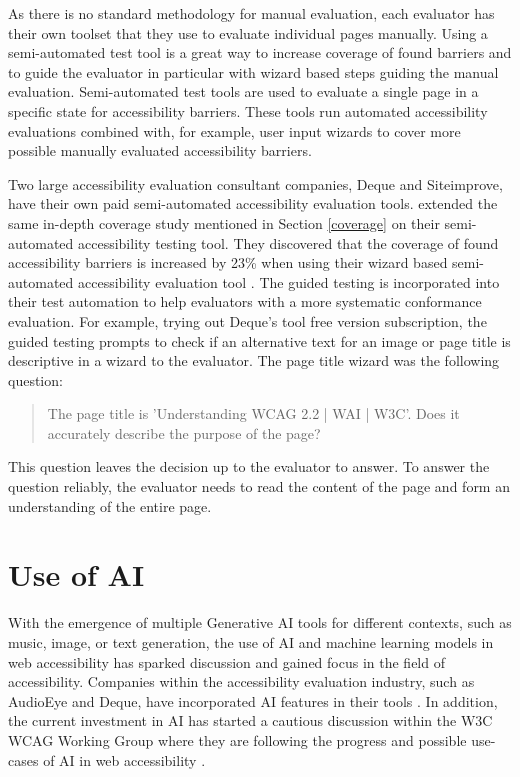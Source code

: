 As there is no standard methodology for manual evaluation, each evaluator has their own toolset that they use to evaluate individual pages manually. Using a semi-automated test tool is a great way to increase coverage of found barriers and to guide the evaluator in particular with wizard based steps guiding the manual evaluation. Semi-automated test tools are used to evaluate a single page in a specific state for accessibility barriers. These tools run automated accessibility evaluations combined with, for example, user input wizards to cover more possible manually evaluated accessibility barriers. 

Two large accessibility evaluation consultant companies, Deque and Siteimprove, have their own paid semi-automated accessibility evaluation tools. \textcite{dequecoverage_semi} extended the same in-depth coverage study mentioned in Section \ref{coverage} on their semi-automated accessibility testing tool. They discovered that the coverage of found accessibility barriers is increased by 23\% when using their wizard based semi-automated accessibility evaluation tool \citep{dequecoverage_semi}. The guided testing is incorporated into their test automation to help evaluators with a more systematic conformance evaluation. For example, trying out Deque's tool free version subscription, the guided testing prompts to check if an alternative text for an image or page title is descriptive in a wizard to the evaluator. The page title wizard was the following question: \blockquote{The page title is 'Understanding WCAG 2.2 | WAI | W3C'. Does it accurately describe the purpose of the page?}. This question leaves the decision up to the evaluator to answer. To answer the question reliably, the evaluator needs to read the content of the page and form an understanding of the entire page.

\section{Use of AI}

With the emergence of multiple Generative AI tools for different contexts, such as music, image, or text generation, the use of AI and machine learning models in web accessibility has sparked discussion and gained focus in the field of accessibility. Companies within the accessibility evaluation industry, such as AudioEye and Deque, have incorporated AI features in their tools \citep{deque_igt, boia_improve_accessibility}. In addition, the current investment in AI has started a cautious discussion within the W3C WCAG Working Group where they are following the progress and possible use-cases of AI in web accessibility \citep{ai_wcag_email}. 

